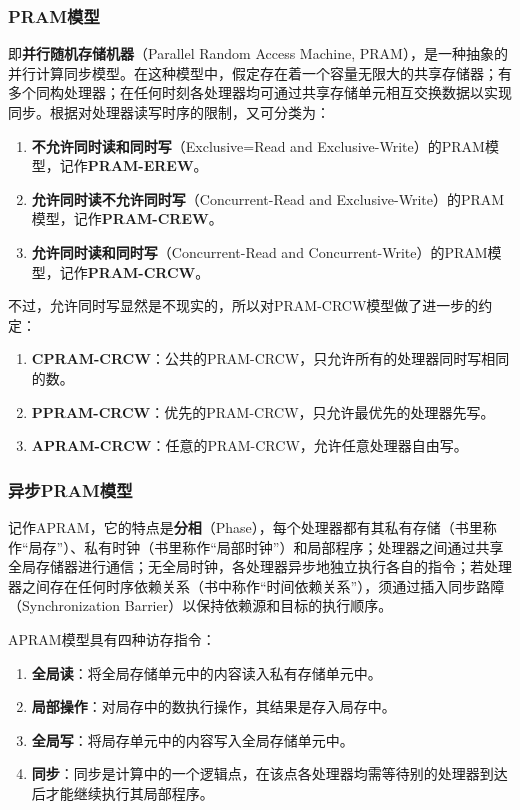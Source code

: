 \documentclass{article}
\begin{document}
			\subsubsection{PRAM模型}
				即\textbf{并行随机存储机器}（Parallel Random Access Machine, PRAM），是一种抽象的并行计算同步模型。在这种模型中，假定存在着一个容量无限大的共享存储器；有多个同构处理器；在任何时刻各处理器均可通过共享存储单元相互交换数据以实现同步。根据对处理器读写时序的限制，又可分类为：
				\begin{enumerate}
					\item \textbf{不允许同时读和同时写}（Exclusive=Read and Exclusive-Write）的PRAM模型，记作\textbf{PRAM-EREW}。
					\item \textbf{允许同时读不允许同时写}（Concurrent-Read and Exclusive-Write）的PRAM模型，记作\textbf{PRAM-CREW}。
					\item \textbf{允许同时读和同时写}（Concurrent-Read and Concurrent-Write）的PRAM模型，记作\textbf{PRAM-CRCW}。
				\end{enumerate}
				不过，允许同时写显然是不现实的，所以对PRAM-CRCW模型做了进一步的约定：
				\begin{enumerate}
					\item \textbf{CPRAM-CRCW}：公共的PRAM-CRCW，只允许所有的处理器同时写相同的数。
					\item \textbf{PPRAM-CRCW}：优先的PRAM-CRCW，只允许最优先的处理器先写。
					\item \textbf{APRAM-CRCW}：任意的PRAM-CRCW，允许任意处理器自由写。
				\end{enumerate}
			\subsubsection{异步PRAM模型}
				记作APRAM，它的特点是\textbf{分相}（Phase），每个处理器都有其私有存储（书里称作``局存''）、私有时钟（书里称作``局部时钟''）和局部程序；处理器之间通过共享全局存储器进行通信；无全局时钟，各处理器异步地独立执行各自的指令；若处理器之间存在任何时序依赖关系（书中称作``时间依赖关系''），须通过插入同步路障（Synchronization Barrier）以保持依赖源和目标的执行顺序。
				
				APRAM模型具有四种访存指令：
				\begin{enumerate}
					\item \textbf{全局读}：将全局存储单元中的内容读入私有存储单元中。
					\item \textbf{局部操作}：对局存中的数执行操作，其结果是存入局存中。
					\item \textbf{全局写}：将局存单元中的内容写入全局存储单元中。
					\item \textbf{同步}：同步是计算中的一个逻辑点，在该点各处理器均需等待别的处理器到达后才能继续执行其局部程序。
				\end{enumerate}
\end{document}

